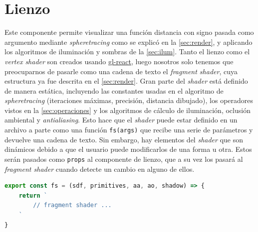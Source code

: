\section{Lienzo}
Este componente permite visualizar una función distancia con signo pasada como argumento mediante \textit{spheretracing} como se explicó en la \autoref{sec:render}, y aplicando los algoritmos de iluminación y sombras de la \autoref{sec:ilum}. Tanto el lienzo como el \textit{vertex shader} son creados usando \href{https://github.com/gre/gl-react}{gl-react}, luego nosotros solo tenemos que preocuparnos de pasarle como una cadena de texto el \textit{fragment shader}, cuya estructura ya fue descrita en el \autoref{sec:render}. Gran parte del \textit{shader} está definido de manera estática, incluyendo las constantes usadas en el algoritmo de \textit{spheretracing} (iteraciones máximas, precisión, distancia dibujado), los operadores vistos en la \autoref{sec:operaciones} y los algoritmos de cálculo de iluminación, oclusión ambiental y \textit{antialiasing}. Esto hace que el \textit{shader} puede estar definido en un archivo a parte como una función \texttt{fs(args)} que recibe una serie de parámetros y devuelve una cadena de texto. Sin embargo, hay elementos del \textit{shader} que son dinámicos debido a que el usuario puede modificarlos de una forma u otra. Estos serán pasados como \texttt{props} al componente de lienzo, que a su vez los pasará al \textit{fragment shader} cuando detecte un cambio en alguno de ellos.
\begin{lstlisting}[language=JavaScript, caption=Definición del procesador de fragmentos]
export const fs = (sdf, primitives, aa, ao, shadow) => {
    return `
        // fragment shader ...
    `
}
\end{lstlisting}

